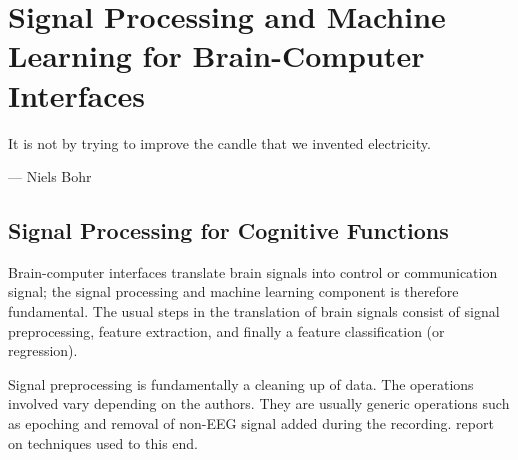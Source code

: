 
\chapter[Signal Processing and Machine Learning for BCI]{Signal Processing and Machine Learning for Brain-Computer Interfaces}
\label{chap:lit_survey_sig_process}
\epigraph{It is not by trying to improve the candle that we invented electricity.}{--- \textup{Niels Bohr}}
\section{Signal Processing for Cognitive Functions}
\label{sec:sig_process}
Brain-computer interfaces translate brain signals into control or communication signal; the signal processing and machine learning component is therefore fundamental.
The usual steps in the translation of brain signals consist of signal preprocessing, feature extraction, and finally a feature classification (or regression).

Signal preprocessing is fundamentally a cleaning up of data. 
The operations involved vary depending on the authors. 
They are usually generic operations such as epoching and removal of non-EEG signal added during the recording. 
\cite{bashashati_survey_2007} report on techniques used to this end.

